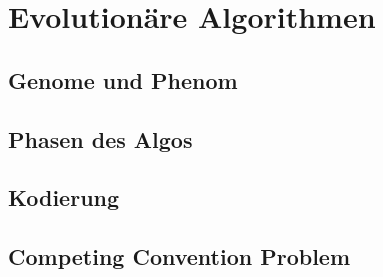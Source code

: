 \section{Evolutionäre Algorithmen}
\subsection{Genome und Phenom}
\subsection{Phasen des Algos}
\subsection{Kodierung}
\subsection{Competing Convention Problem}
\label{subsec:competing_convention_problem}
